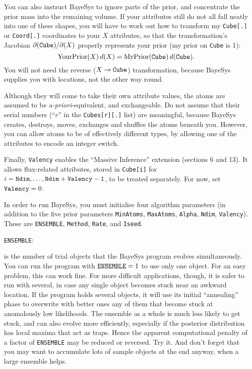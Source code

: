 You can also instruct BayeSys to ignore parts of the prior, and concentrate the prior mass into the remaining volume.  
If your attributes still do not all fall neatly into one of these shapes, 
you will have to work out how to transform my {\tt Cube[.]} or {\tt Coord[.]} coordinates to your $X$ attributes, 
so that the transformation's Jacobian $\partial({\tt Cube})/\partial(X)$ properly represents your prior (my prior on {\tt Cube} is 1):
$$
     {\rm YourPrior}(X)\,d(X) = {\rm MyPrior}({\tt Cube})\,d({\tt Cube}) .
$$
You will not need the reverse ($X \rightarrow {\tt Cube}$) transformation, because BayeSys supplies you with locations, not the other way round.

Although they will come to take their own attribute values, the atoms are assumed to be {\it a-priori}-equivalent, and exchangeable. 
Do not assume that their serial numbers (``$r$'' in the {\tt Cubes[r][.]} list) are meaningful, 
because BayeSys creates, destroys, moves, exchanges and shuffles the atoms beneath you.  
However, you can allow atoms to be of effectively different types, by allowing one of the attributes to encode an integer switch.

Finally, {\tt Valency} enables the ``Massive Inference'' extension (sections 6 and 13).  
It allows flux-related attributes, stored in {\tt Cube[i]} for $i={\tt Ndim},\ldots,{\tt Ndim+Valency-1}$, to be treated separately.
For now, set ${\tt Valency} = 0$.

\vfill\eject
{}
\bigskip

In order to run BayeSys, you must initialise four algorithm parameters 
(in addition to the five prior parameters {\tt MinAtoms}, {\tt MaxAtoms}, {\tt Alpha}, {\tt Ndim}, {\tt Valency}).  
These are {\tt ENSEMBLE}, {\tt Method}, {\tt Rate}, and {\tt Iseed}.

\bigskip
{\tt ENSEMBLE}:

 is the number of trial objects that the BayeSys program evolves simultaneously.  
You can run the program with ${\tt ENSEMBLE}=1$ to use only one object.  
For an easy problem, this can work fine.  
For more difficult applications, though, it is safer to run with several, in case any single object becomes stuck near an awkward location.  
If the program holds several objects, 
it will use its initial ``annealing'' phase to overwrite with better ones any of them that become stuck at anomalously low likelihoods.
The ensemble as a whole is much less likely to get stuck, and can also evolve more efficiently, 
especially if the posterior distribution has local maxima that act as traps.
Hence the apparent computational penalty of a factor of {\tt ENSEMBLE} may be reduced or reversed.  Try it.  
And don't forget that you may want to accumulate lots of sample objects at the end anyway, when a large ensemble helps.



